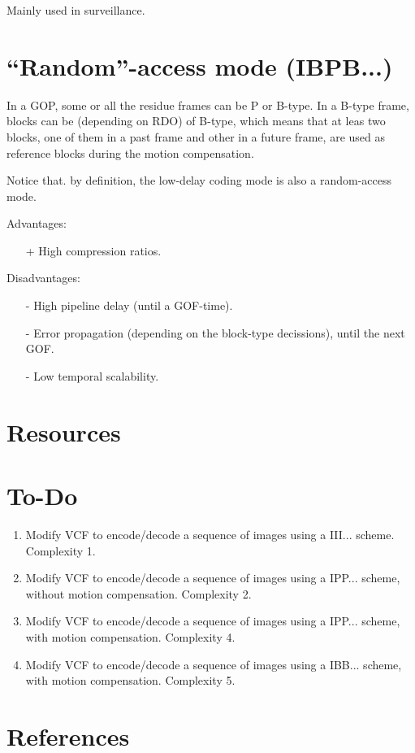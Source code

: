 Mainly used in surveillance.

\section{``Random''-access mode (IBPB...)}
\label{sec:random}

In a GOP, some or all the residue frames can be P or B-type. In a
B-type frame, blocks can be (depending on RDO) of B-type, which means
that at leas two blocks, one of them in a past frame and other in a
future frame, are used as reference blocks during the motion
compensation.

Notice that. by definition, the low-delay coding mode is also a
random-access mode.

Advantages:
\begin{itemize}
\item [+] High compression ratios.
\end{itemize}

Disadvantages:
\begin{enumerate}
\item [-] High pipeline delay (until a GOF-time).
\item [-] Error propagation (depending on the block-type decissions),
  until the next GOF.
\item [-] Low temporal scalability.
\end{enumerate}

\section{Resources}

\section{To-Do}

\begin{enumerate}
\item Modify VCF to encode/decode a sequence of images using a
  III... scheme. Complexity 1.
\item Modify VCF to encode/decode a sequence of images using a
  IPP... scheme, without motion compensation. Complexity 2.
\item Modify VCF to encode/decode a sequence of images using a
  IPP... scheme, with motion compensation. Complexity 4.
\item Modify VCF to encode/decode a sequence of images using a
  IBB... scheme, with motion compensation. Complexity 5.
\end{enumerate}

  
\section{References}

\renewcommand{\addcontentsline}[3]{}%


